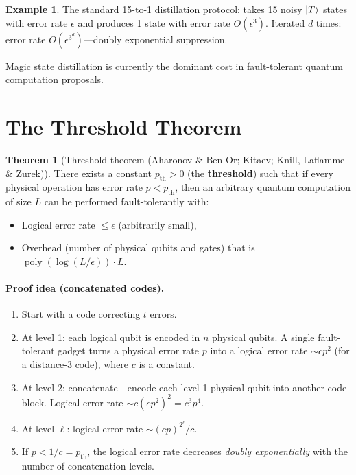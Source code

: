 \documentclass[11pt]{article}
\theoremstyle{definition}
\newtheorem{example}{Example}[section]
\newtheorem{theorem}{Theorem}[section]
\begin{document}
\begin{example}
The standard 15-to-1 distillation protocol: takes 15 noisy $\ket{T}$ states with error rate $\epsilon$ and produces 1 state with error rate $O(\epsilon^3)$.  Iterated $d$ times: error rate $O(\epsilon^{3^d})$---doubly exponential suppression.
\end{example}

Magic state distillation is currently the dominant cost in fault-tolerant quantum computation proposals.

\section{The Threshold Theorem}

\begin{theorem}[Threshold theorem (Aharonov \& Ben-Or; Kitaev; Knill, Laflamme \& Zurek)]
There exists a constant $p_{\mathrm{th}}>0$ (the \textbf{threshold}) such that if every physical operation has error rate $p<p_{\mathrm{th}}$, then an arbitrary quantum computation of size $L$ can be performed fault-tolerantly with:
\begin{itemize}
    \item Logical error rate $\le\epsilon$ (arbitrarily small),
    \item Overhead (number of physical qubits and gates) that is $\operatorname{poly}(\log(L/\epsilon))\cdot L$.
\end{itemize}
\end{theorem}

\paragraph{Proof idea (concatenated codes).}
\begin{enumerate}
    \item Start with a code correcting $t$ errors.
    \item At level 1: each logical qubit is encoded in $n$ physical qubits.  A single fault-tolerant gadget turns a physical error rate $p$ into a logical error rate $\sim cp^2$ (for a distance-3 code), where $c$ is a constant.
    \item At level 2: concatenate---encode each level-1 physical qubit into another code block.  Logical error rate $\sim c(cp^2)^2 = c^3 p^4$.
    \item At level $\ell$: logical error rate $\sim (cp)^{2^\ell}/c$.
    \item If $p < 1/c = p_{\mathrm{th}}$, the logical error rate decreases \emph{doubly exponentially} with the number of concatenation levels.
\end{enumerate}
\end{document}
